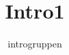\documentclass[a4paper,11pt]{article}
\title{Intro1}
\author{introgruppen}
\begin{document}
\maketitle
  
\begin{sketch}


\end{sketch}
\end{document}
